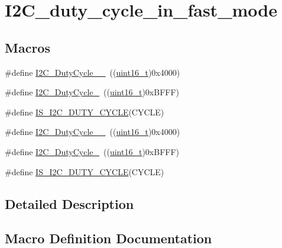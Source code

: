 \hypertarget{group___i2_c__duty__cycle__in__fast__mode}{}\section{I2\+C\+\_\+duty\+\_\+cycle\+\_\+in\+\_\+fast\+\_\+mode}
\label{group___i2_c__duty__cycle__in__fast__mode}
\subsection*{Macros}
\begin{DoxyCompactItemize}
\item 
\#define \hyperlink{group___i2_c__duty__cycle__in__fast__mode_ga2b4ff186808a8095fc2d1b8193f30ce1}{I2\+C\+\_\+\+Duty\+Cycle\+\_\+\_}~((\hyperlink{_p_e___types_8h_a1f1825b69244eb3ad2c7165ddc99c956}{uint16\+\_\+t})0x4000)
\item 
\#define \hyperlink{group___i2_c__duty__cycle__in__fast__mode_gafe0af31970aceef0fa8df6a10bef35db}{I2\+C\+\_\+\+Duty\+Cycle\+\_}~((\hyperlink{_p_e___types_8h_a1f1825b69244eb3ad2c7165ddc99c956}{uint16\+\_\+t})0x\+B\+F\+F\+F)
\item 
\#define \hyperlink{group___i2_c__duty__cycle__in__fast__mode_gae9b3276d9b6ec872ee4fafa2b2fafb83}{I\+S\+\_\+\+I2\+C\+\_\+\+D\+U\+T\+Y\+\_\+\+C\+Y\+C\+LE}(C\+Y\+C\+LE)
\item 
\#define \hyperlink{group___i2_c__duty__cycle__in__fast__mode_ga2b4ff186808a8095fc2d1b8193f30ce1}{I2\+C\+\_\+\+Duty\+Cycle\+\_\+\_}~((\hyperlink{_p_e___types_8h_a1f1825b69244eb3ad2c7165ddc99c956}{uint16\+\_\+t})0x4000)
\item 
\#define \hyperlink{group___i2_c__duty__cycle__in__fast__mode_gafe0af31970aceef0fa8df6a10bef35db}{I2\+C\+\_\+\+Duty\+Cycle\+\_}~((\hyperlink{_p_e___types_8h_a1f1825b69244eb3ad2c7165ddc99c956}{uint16\+\_\+t})0x\+B\+F\+F\+F)
\item 
\#define \hyperlink{group___i2_c__duty__cycle__in__fast__mode_gae9b3276d9b6ec872ee4fafa2b2fafb83}{I\+S\+\_\+\+I2\+C\+\_\+\+D\+U\+T\+Y\+\_\+\+C\+Y\+C\+LE}(C\+Y\+C\+LE)
\end{DoxyCompactItemize}


\subsection{Detailed Description}


\subsection{Macro Definition Documentation}
